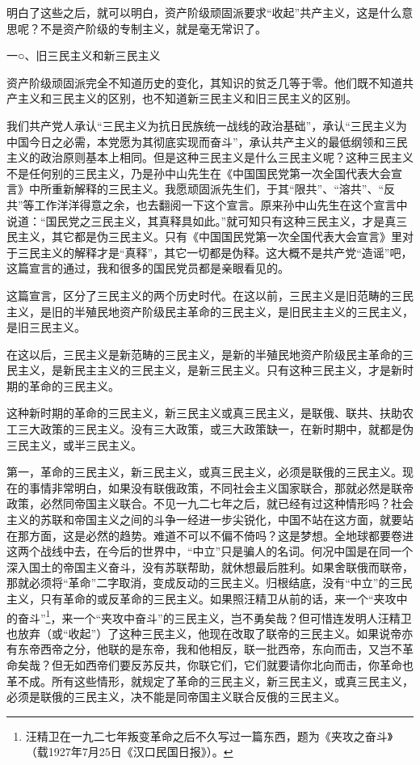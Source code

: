\documentclass[UTF8, 12pt, a4paper]{ctexrep}
\begin{document}
明白了这些之后，就可以明白，资产阶级顽固派要求“收起”共产主义，这是什么意思呢？不是资产阶级的专制主义，就是毫无常识了。

一○、旧三民主义和新三民主义

资产阶级顽固派完全不知道历史的变化，其知识的贫乏几等于零。他们既不知道共产主义和三民主义的区别，也不知道新三民主义和旧三民主义的区别。

我们共产党人承认“三民主义为抗日民族统一战线的政治基础”，承认“三民主义为中国今日之必需，本党愿为其彻底实现而奋斗”，承认共产主义的最低纲领和三民主义的政治原则基本上相同。但是这种三民主义是什么三民主义呢？这种三民主义不是任何别的三民主义，乃是孙中山先生在《中国国民党第一次全国代表大会宣言》中所重新解释的三民主义。我愿顽固派先生们，于其“限共”、“溶共”、“反共”等工作洋洋得意之余，也去翻阅一下这个宣言。原来孙中山先生在这个宣言中说道：“国民党之三民主义，其真释具如此。”就可知只有这种三民主义，才是真三民主义，其它都是伪三民主义。只有《中国国民党第一次全国代表大会宣言》里对于三民主义的解释才是“真释”，其它一切都是伪释。这大概不是共产党“造谣”吧，这篇宣言的通过，我和很多的国民党员都是亲眼看见的。

这篇宣言，区分了三民主义的两个历史时代。在这以前，三民主义是旧范畴的三民主义，是旧的半殖民地资产阶级民主革命的三民主义，是旧民主主义的三民主义，是旧三民主义。

在这以后，三民主义是新范畴的三民主义，是新的半殖民地资产阶级民主革命的三民主义，是新民主主义的三民主义，是新三民主义。只有这种三民主义，才是新时期的革命的三民主义。

这种新时期的革命的三民主义，新三民主义或真三民主义，是联俄、联共、扶助农工三大政策的三民主义。没有三大政策，或三大政策缺一，在新时期中，就都是伪三民主义，或半三民主义。

第一，革命的三民主义，新三民主义，或真三民主义，必须是联俄的三民主义。现在的事情非常明白，如果没有联俄政策，不同社会主义国家联合，那就必然是联帝政策，必然同帝国主义联合。不见一九二七年之后，就已经有过这种情形吗？社会主义的苏联和帝国主义之间的斗争一经进一步尖锐化，中国不站在这方面，就要站在那方面，这是必然的趋势。难道不可以不偏不倚吗？这是梦想。全地球都要卷进这两个战线中去，在今后的世界中，“中立”只是骗人的名词。何况中国是在同一个深入国土的帝国主义奋斗，没有苏联帮助，就休想最后胜利。如果舍联俄而联帝，那就必须将“革命”二字取消，变成反动的三民主义。归根结底，没有“中立”的三民主义，只有革命的或反革命的三民主义。如果照汪精卫从前的话，来一个“夹攻中的奋斗”\footnote{汪精卫在一九二七年叛变革命之后不久写过一篇东西，题为《夹攻之奋斗》（载1927年7月25日《汉口民国日报》）。}，来一个“夹攻中奋斗”的三民主义，岂不勇矣哉？但可惜连发明人汪精卫也放弃（或“收起”）了这种三民主义，他现在改取了联帝的三民主义。如果说帝亦有东帝西帝之分，他联的是东帝，我和他相反，联一批西帝，东向而击，又岂不革命矣哉？但无如西帝们要反苏反共，你联它们，它们就要请你北向而击，你革命也革不成。所有这些情形，就规定了革命的三民主义，新三民主义，或真三民主义，必须是联俄的三民主义，决不能是同帝国主义联合反俄的三民主义。
\end{document}
